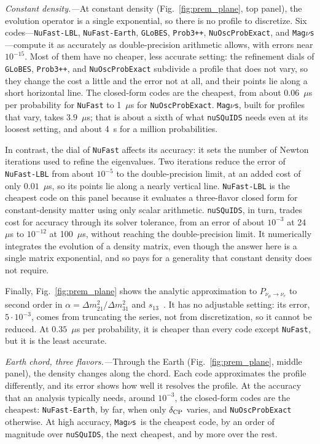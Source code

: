 \documentclass[final,5p,times,twocolumn,sort,compress]{elsarticle}
\makeatletter
\newcommand{\fig}{Fig.}
\DeclareRobustCommand{\_}{%
  \ifmmode\nfss@text{\textunderscore}\else\textunderscore\allowbreak\fi}
\newcommand{\figu}[1]{\fig~\ref{fig:#1}}
\newcommand{\magnus}{{\tt Mag}\ensuremath{\nu}{\tt s}}
\makeatother
\begin{document}
\smallskip

\textit{Constant density.---}At constant density (\figu{prem_plane}, top panel), the evolution operator is a single exponential, so there is no profile to discretize. Six codes---{\tt NuFast-LBL}, {\tt NuFast-Earth}, {\tt GLoBES}, {\tt Prob3++}, {\tt NuOscProbExact}, and \magnus---compute it as accurately as double-precision arithmetic allows, with errors near $10^{-15}$. Most of them have no cheaper, less accurate setting: the refinement dials of {\tt GLoBES}, {\tt Prob3++}, and {\tt NuOscProbExact} subdivide a profile that does not vary, so they change the cost a little and the error not at all, and their points lie along a short horizontal line. The closed-form codes are the cheapest, from about $0.06$~$\mu$s per probability for {\tt NuFast} to 1~$\mu$s for {\tt NuOscProbExact}. \magnus, built for profiles that vary, takes $3.9$~$\mu$s; that is about a sixth of what {\tt nuSQuIDS} needs even at its loosest setting, and about 4~s for a million probabilities.

In contrast, the dial of {\tt NuFast} affects its accuracy: it sets the number of Newton iterations used to refine the eigenvalues. Two iterations reduce the error of {\tt NuFast-LBL} from about $10^{-5}$ to the double-precision limit, at an added cost of only $0.01$~$\mu$s, so its points lie along a nearly vertical line. {\tt NuFast-LBL} is the cheapest code on this panel because it evaluates a three-flavor closed form for constant-density matter using only scalar arithmetic. {\tt nuSQuIDS}, in turn, trades cost for accuracy through its solver tolerance, from an error of about $10^{-3}$ at 24~$\mu$s to $10^{-12}$ at 100~$\mu$s, without reaching the double-precision limit. It numerically integrates the evolution of a density matrix, even though the answer here is a single matrix exponential, and so pays for a generality that constant density does not require.

Finally, \figu{prem_plane} shows the analytic approximation to $P_{\nu_\mu \to \nu_e}$ to second order in $\alpha = \Delta m^2_{21}/\Delta m^2_{31}$ and $s_{13}$\ \cite{Cervera:2000kp, Freund:2001pn}. It has no adjustable setting: its error, $5 \cdot 10^{-3}$, comes from truncating the series, not from discretization, so it cannot be reduced. At $0.35$~$\mu$s per probability, it is cheaper than every code except {\tt NuFast}, but it is the least accurate.

\smallskip

\textit{Earth chord, three flavors.---}Through the Earth (\figu{prem_plane}, middle panel), the density changes along the chord. Each code approximates the profile differently, and its error shows how well it resolves the profile. At the accuracy that an analysis typically needs, around $10^{-3}$, the closed-form codes are the cheapest: {\tt NuFast-Earth}, by far, when only $\delta_{\rm CP}$ varies, and {\tt NuOscProbExact} otherwise. At high accuracy, \magnus\ is the cheapest code, by an order of magnitude over {\tt nuSQuIDS}, the next cheapest, and by more over the rest.
\end{document}
